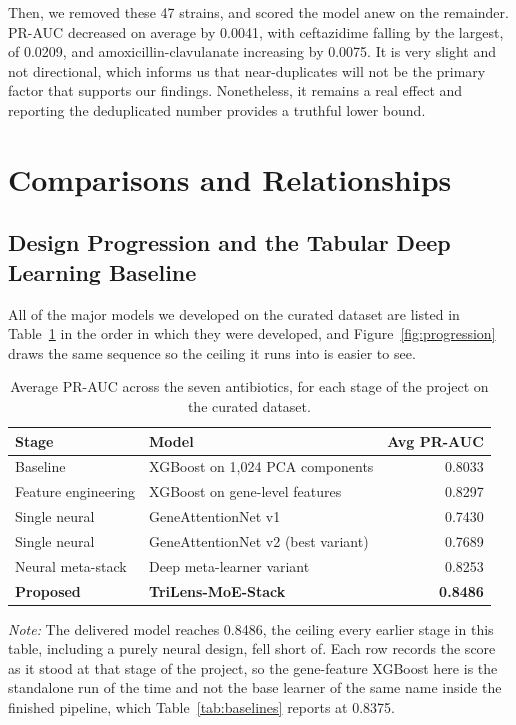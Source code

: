 Then, we removed these 47 strains, and scored the model anew on the
remainder. PR-AUC decreased on average by 0.0041, with ceftazidime falling by
the largest, of 0.0209, and amoxicillin-clavulanate increasing by 0.0075. It
is very slight and not directional, which informs us that near-duplicates
will not be the primary factor that supports our findings. Nonetheless, it
remains a real effect and reporting the deduplicated number provides a
truthful lower bound.

\FloatBarrier
\section{Comparisons and Relationships}
\label{sec:comparisons}

\FloatBarrier
\subsection{Design Progression and the Tabular Deep Learning Baseline}

All of the major models we developed on the curated dataset are listed in
Table~\ref{tab:progression} in the order in which they were developed, and
Figure~\ref{fig:progression} draws the same sequence so the ceiling it runs into is
easier to see.

\begin{table}[htb]
\centering
\caption{Average PR-AUC across the seven antibiotics, for each stage of the
project on the curated dataset.}
\label{tab:progression}
\small
\begin{tabular}{|l|l|r|}
\hline
\textbf{Stage} & \textbf{Model} & \textbf{Avg PR-AUC} \\ \hline
Baseline            & XGBoost on 1{,}024 PCA components   & 0.8033 \\ \hline
Feature engineering & XGBoost on gene-level features   & 0.8297 \\ \hline
Single neural       & GeneAttentionNet v1              & 0.7430 \\ \hline
Single neural       & GeneAttentionNet v2 (best variant) & 0.7689 \\ \hline
Neural meta-stack   & Deep meta-learner variant        & 0.8253 \\ \hline
\textbf{Proposed}   & \textbf{TriLens-MoE-Stack}       & \textbf{0.8486} \\ \hline
\end{tabular}
\vspace{0.4em}

\noindent\footnotesize\textit{Note:} The delivered model reaches 0.8486, the ceiling every
earlier stage in this table, including a purely neural design, fell short of. Each row records
the score as it stood at that stage of the project, so the gene-feature XGBoost here is the
standalone run of the time and not the base learner of the same name inside the finished
pipeline, which Table~\ref{tab:baselines} reports at 0.8375.
\end{table}

